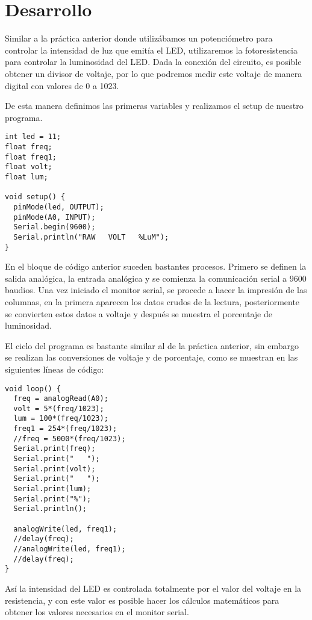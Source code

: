 \documentclass[12pt, letterpaper]{article}
\begin{document}
\section*{Desarrollo}

Similar a la práctica anterior donde utilizábamos un potenciómetro para controlar la intensidad de luz que emitía el LED, utilizaremos la fotoresistencia para controlar la luminosidad del LED. Dada la conexión del circuito, es posible obtener un divisor de voltaje, por lo que podremos medir este voltaje de manera digital con valores de 0 a 1023. 

De esta manera definimos las primeras variables y realizamos el setup de nuestro programa.

\begin{lstlisting}[language=Arduino]
int led = 11;
float freq;
float freq1;
float volt;
float lum;

void setup() {
  pinMode(led, OUTPUT);
  pinMode(A0, INPUT);
  Serial.begin(9600);
  Serial.println("RAW   VOLT   %LuM");
}
\end{lstlisting}

En el bloque de código anterior suceden bastantes procesos. Primero se definen la salida analógica, la entrada analógica y se comienza la comunicación serial a 9600 baudios. Una vez iniciado el monitor serial, se procede a hacer la impresión de las columnas, en la primera aparecen los datos crudos de la lectura, posteriormente se convierten estos datos a voltaje y después se muestra el porcentaje de luminosidad.

El ciclo del programa es bastante similar al de la práctica anterior, sin embargo se realizan las conversiones de voltaje y de porcentaje, como se muestran en las siguientes líneas de código:

\begin{lstlisting}[language=Arduino]
void loop() { 
  freq = analogRead(A0);
  volt = 5*(freq/1023);
  lum = 100*(freq/1023);
  freq1 = 254*(freq/1023);
  //freq = 5000*(freq/1023); 
  Serial.print(freq);
  Serial.print("   ");
  Serial.print(volt);
  Serial.print("   ");
  Serial.print(lum);
  Serial.print("%");
  Serial.println();

  analogWrite(led, freq1);
  //delay(freq);
  //analogWrite(led, freq1);
  //delay(freq);
}
\end{lstlisting}

Así la intensidad del LED es controlada totalmente por el valor del voltaje en la resistencia, y con este valor es posible hacer los cálculos matemáticos para obtener los valores necesarios en el monitor serial. 
\end{document}
